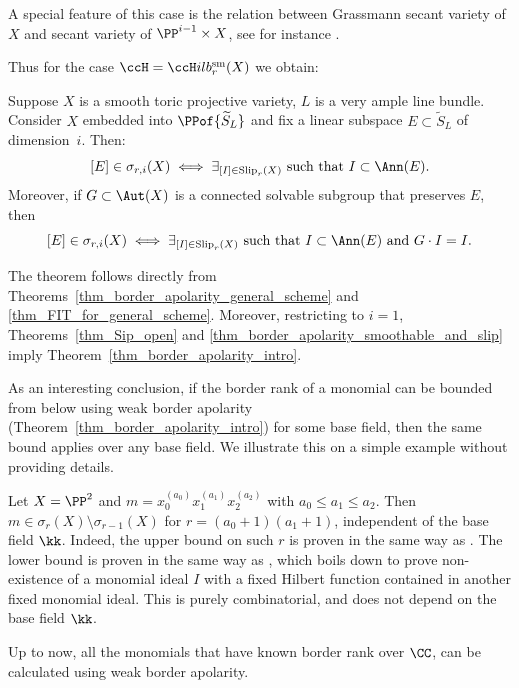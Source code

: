 \documentclass[12pt,a4paper]{article}
\newcommand{\usualHilb}{{\ccH}ilb}
\newcommand{\usualHilbsm}[2][r]{\usualHilb_{#1} ^{\operatorname{sm}}{(#2)}}
\DeclareMathOperator{\Slip}{Slip}
\begin{document}
A special feature of this case is the relation between Grassmann secant variety of $X$ and secant variety of $\PP^{i-1}\times X$, see for instance \cite[Thm~2.5, Cor.~3.6(iii)]{landsberg_jabu_ranks_of_tensors}.



Thus for the case $\ccH = \usualHilbsm{X}$ we obtain:
\begin{thm}
   \label{thm_border_apolarity_smoothable_and_slip}
   Suppose $X$ is a smooth toric projective variety, $L$ is a very ample line bundle.
   Consider $X$ embedded into $\PPof{\widetilde{S}_L}$
   and fix a linear subspace $E\subset \widetilde{S}_L$ of dimension~$i$.
   Then:
   \[
     [E]\in \sigma_{r,i}(X) \iff
     \exists_{[I] \in \Slip_r(X)} \text{ such that } I \subset \Ann(E).
   \]
   Moreover, if $G\subset \Aut(X)$ is a connected solvable subgroup that preserves $E$,
    then
    \[
      [E]\in \sigma_{r,i}(X) \iff
       \exists_{[I] \in \Slip_r(X)} \text{ such that } I \subset \Ann(E)\text{ and } G\cdot I =I.
    \]
\end{thm}
The theorem follows directly from Theorems~\ref{thm_border_apolarity_general_scheme} and \ref{thm_FIT_for_general_scheme}.
Moreover, restricting to $i=1$,
Theorems~\ref{thm_Sip_open}
and \ref{thm_border_apolarity_smoothable_and_slip}
imply Theorem~\ref{thm_border_apolarity_intro}.


As an interesting conclusion, if the border rank of a monomial can be bounded from below using weak border apolarity (Theorem~\ref{thm_border_apolarity_intro}) for some base field, then the same bound applies over any base field.
We illustrate this on a simple example without providing details.
\begin{example}
   Let $X=\PP^2$ and $m = x_0^{(a_0)}x_1^{(a_1)}x_2^{(a_2)}$ with $a_0\leqslant a_1 \leqslant a_2$.
   Then $m \in \sigma_r(X) \setminus \sigma_{r-1}(X)$
   for $r=(a_0+1)(a_1+1)$,
   independent of the base field $\kk$.
   Indeed, the upper bound on such $r$ is proven in the same way as \cite[Lem.~6.2]{nisiabu_jabu_border_apolarity}.
   The lower bound is proven in the same way as \cite[Thm~6.21]{nisiabu_jabu_border_apolarity},
     which boils down to prove non-existence of a monomial ideal $I$ with a fixed Hilbert function contained in another fixed monomial ideal.
   This is purely combinatorial,
      and does not depend on the base field $\kk$.
\end{example}

Up to now, all the monomials that have known border rank over $\CC$, can be calculated using weak border apolarity.
\end{document}
